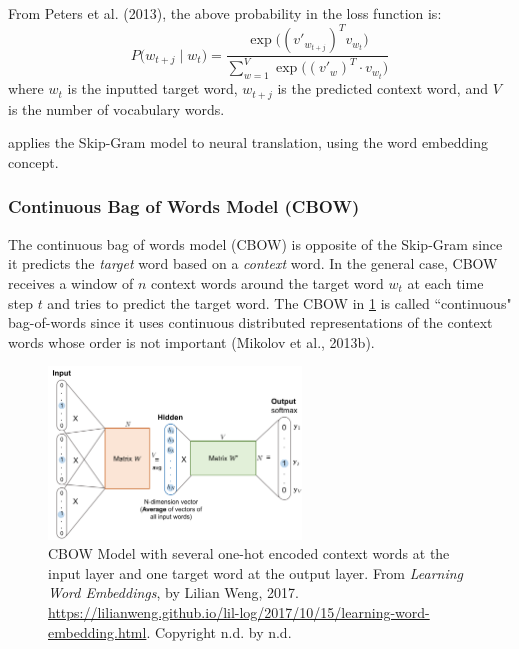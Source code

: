 From Peters et al. (2013), the above probability in the loss function is:
$$
P \Big( w_{t+j} \; | \; w_t \Big) = \frac {\exp{ \Big( (v'_{w_{t+j}})^T  v_{w_t} \Big) }} {\sum_{w=1}^V \exp{ \Big( (v'_w)^T \cdot v_{w_t} \Big) }}
$$
where $w_t$ is the inputted target word, $w_{t+j}$ is the predicted context word, and $V$ is the number of vocabulary words. 
\newline

 applies the Skip-Gram model to neural translation, using the word embedding concept. 


\subsubsection{Continuous Bag of Words Model (CBOW)} \label{sec:CBOW}

The continuous bag of words model (CBOW) is opposite of the Skip-Gram since it predicts the \emph{target} word based on a \emph{context} word. In the general case, CBOW receives a window of $n$ context words around the target word $w_t$ at each time step $t$ and tries to predict the target word. The CBOW in \cref{fig:CBOW} is called ``continuous" bag-of-words since it uses continuous distributed representations of the context words whose order is not important (Mikolov et al., 2013b). 

\begin{figure}[h] 
\vspace{-5pt}
\centering
\includegraphics[width=0.6\textwidth]{imgs/cbow.png}
\vspace{-5pt}
\caption{\footnotesize CBOW Model with several one-hot encoded context words at the input layer and one target word at the output layer. From \emph{Learning Word Embeddings}, by Lilian Weng, 2017. \url{https://lilianweng.github.io/lil-log/2017/10/15/learning-word-embedding.html}. Copyright n.d. by n.d.}
\label{fig:CBOW}
\vspace{-5pt}
\end{figure}

